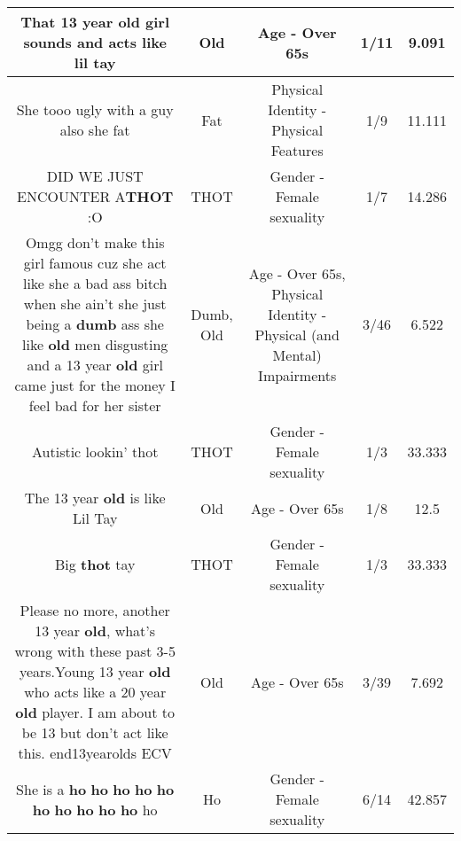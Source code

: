 \documentclass[11pt]{article}
\newlength\mylength
\begin{document}
\begin{center}
\begin{longtable}{|C{.65\mylength}|C{.30\mylength}|C{.12\mylength}|C{.12\mylength}|C{.12\mylength}|}
  \small That 13 year \textbf{old} girl sounds and acts like lil tay\normalsize   & Old & Age - Over 65s & 1/11 & 9.091 \\  \hline
  \small She tooo ugly with a guy also she fat\normalsize   & Fat & Physical Identity - Physical Features & 1/9 & 11.111 \\  \hline
  \small DID WE JUST ENCOUNTER A\textbf{THOT} :O\normalsize   & THOT & Gender - Female sexuality & 1/7 & 14.286 \\  \hline
  \small Omgg don't make this girl famous cuz she act like she a bad ass bitch when she ain't she just being a \textbf{dumb} ass she like \textbf{old} men disgusting and a 13 year \textbf{old} girl came just for the money I feel bad for her sister\normalsize   & Dumb, Old & Age - Over 65s, Physical Identity - Physical (and Mental) Impairments & 3/46 & 6.522 \\  \hline
  \small Autistic lookin' thot\normalsize   & THOT & Gender - Female sexuality & 1/3 & 33.333 \\  \hline
  \small The 13 year \textbf{old} is like Lil Tay\normalsize   & Old & Age - Over 65s & 1/8 & 12.5 \\  \hline
  \small Big \textbf{thot} tay\normalsize   & THOT & Gender - Female sexuality & 1/3 & 33.333 \\  \hline
  \small Please no more, another 13 year \textbf{old}, what's wrong with these past 3-5 years.Young 13 year \textbf{old} who acts like a 20 year \textbf{old} player. I am about to be 13 but don't act like this. end13yearolds ECV\normalsize   & Old & Age - Over 65s & 3/39 & 7.692 \\  \hline
  \small She is a \textbf{ho} \textbf{ho} \textbf{ho} \textbf{ho} \textbf{ho} \textbf{ho} \textbf{ho} \textbf{ho} \textbf{ho} \textbf{ho} ho\normalsize   & Ho & Gender - Female sexuality & 6/14 & 42.857 \\  \hline

\end{longtable}
\end{center}
\end{document}
